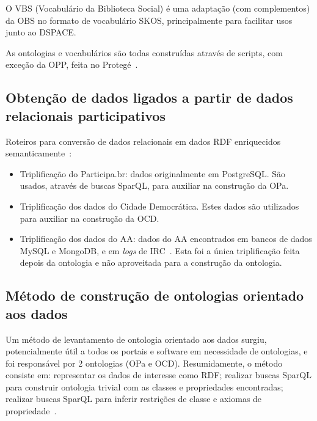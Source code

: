 \documentclass[a4paper,openright,12pt]{report} %
\begin{document}
O
VBS (Vocabulário da Biblioteca Social) é uma adaptação (com complementos)
            da OBS no formato
            de vocabulário SKOS, principalmente para facilitar
            usos junto ao DSPACE.

As ontologias e vocabulários são todas construídas através de scripts, com exceção da
OPP, feita no Protegé~\cite{pnud5}.

\subsection{Obtenção de dados ligados a partir de dados relacionais participativos}
Roteiros para conversão de dados relacionais em dados RDF enriquecidos semanticamente~\cite{pnud5}:
\begin{itemize}
    \item Triplificação do Participa.br: 
        dados originalmente em PostgreSQL. São usados, através de buscas SparQL, para auxiliar na construção da OPa.
    \item Triplificação dos dados do Cidade Democrática.
        Estes
        dados são utilizados para auxiliar na construção
        da OCD.
    \item Triplificação dos dados do AA:
        dados do AA encontrados em bancos de dados MySQL
        e MongoDB, e em \emph{logs} de IRC~\cite{ensaaio,pnud5}.
                Esta foi a única triplificação feita depois da ontologia e não aproveitada para a construção da ontologia.
\end{itemize}


\subsection{Método de construção de ontologias orientado aos dados}\label{sec:oda}
Um método de levantamento de ontologia orientado aos dados surgiu, potencialmente útil a todos os portais e software em necessidade de ontologias, e foi responsável por 2 ontologias (OPa e OCD).
Resumidamente, o método consiste em: representar os dados de interesse como RDF; realizar buscas SparQL para construir ontologia trivial com as classes e propriedades encontradas; realizar buscas SparQL para inferir restrições de classe e axiomas de propriedade~\cite{pnud5}.
\end{document}
